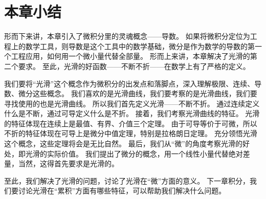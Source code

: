 \section{本章小结}

形而下来讲，本章引入了微积分里的灵魂概念——导数。
如果将微积分定位为工程上的数学工具，则导数是这个工具中的数学基础，微分是作为数学的导数的第一个工程应用，如何用一个微小量代替全部量。
形而上来讲，本章解决了光滑的第二个要求。
至此，光滑的好函数——不断不折——在数学上有了严格的定义。

我们要将“光滑”这个概念作为微积分的出发点和落脚点，深入理解极限、连续、导数、微分这些概念。
我们喜欢的是光滑曲线，我们要考察的是光滑曲线，我们要寻找使用的也是光滑曲线。
所以我们首先定义光滑——不断不折。
通过连续定义什么是不断，通过可导定义什么是不折。
接着，我们考察光滑曲线的特征。
光滑的特征体现在连续上是最值、有界、介值三个定理。
由于可导等价于可微，所以不折的特征体现在可导上是微分中值定理，特别是拉格朗日定理。
充分领悟光滑这个概念，这些定理将会是无比自然。
最后，我们从“微”的角度考察光滑的好处，即光滑的实际价值。
我们提出了微分的概念，用一个线性小量代替绝对差量，当然，这得首先要求是光滑的。

至此，我们解决了光滑的问题，讨论了光滑在“微”方面的意义。
下一章积分，我们要讨论光滑在“累积”方面有哪些特征，可以帮助我们解决什么问题。




